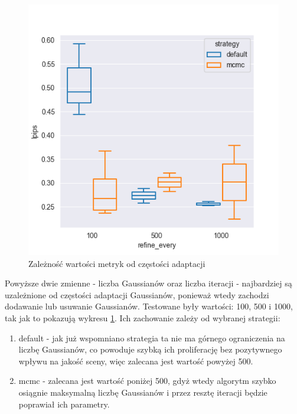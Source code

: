 \begin{figure}[h!]
\begin{minipage}{0.3\textwidth}
    \end{minipage}
    \hfill
    \begin{minipage}{0.3\textwidth}
        \centering
        \includegraphics[width=\textwidth]{img/gs_metrics/lpips_refine_every.png}
    \end{minipage}
    \caption{Zależność wartości metryk od częstości adaptacji}
    \label{fig:refine_every_gs_metrics}
\end{figure}

Powyższe dwie zmienne - liczba Gaussianów oraz liczba iteracji - najbardziej są uzależnione od częstości adaptacji Gaussianów, ponieważ wtedy zachodzi dodawanie lub usuwanie Gaussianów. Testowane były wartości: 100, 500 i 1000, tak jak to pokazują wykresu \ref{fig:refine_every_gs_metrics}. Ich zachowanie zależy od wybranej strategii: 
\begin{enumerate}
    \item default - jak już wspomniano strategia ta nie ma górnego ograniczenia na liczbę Gaussianów, co powoduje szybką ich proliferację bez pozytywnego wpływu na jakość sceny, więc zalecana jest wartość powyżej 500.
    \item mcmc - zalecana jest wartość poniżej 500, gdyż wtedy algorytm szybko osiągnie maksymalną liczbę Gaussianów i przez resztę iteracji będzie poprawiał ich parametry.  
\end{enumerate}

